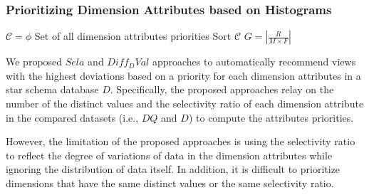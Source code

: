 \subsubsection{Prioritizing Dimension Attributes based on Histograms}
\label{sec:priority_hist}
%
\begin{algorithm}[t]
\label{alg:prio_hist1}
\caption{$DimsHisto$}
$\mathcal{C} = \phi$ Set of all dimension attributes priorities \;
Sort $\mathcal{C}$\;
	$G= |\frac{R}{M \times F}|$ \;
		\;
\end{algorithm}
We proposed $Sela$ and $Diff_DVal$ approaches to automatically recommend views with the highest deviations based on a priority for each dimension attributes in a star schema database $D$.
%
Specifically, the proposed approaches relay on the number of the distinct values and the selectivity ratio of each dimension attribute in the compared datasets (i.e., $DQ$ and $D$) to compute the attributes priorities.
%

However, the limitation
of the proposed approaches is using the selectivity ratio 
to reflect the degree of variations of data in the dimension attributes while ignoring the distribution of data itself. 
%
In addition, it is difficult to prioritize dimensions that have the same distinct values or the same selectivity ratio.
%

